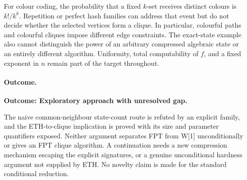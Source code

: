 \documentclass[11pt,a4paper]{article}
\numberwithin{equation}{section}
\begin{document}
For colour coding, the probability that a fixed $k$-set receives distinct
colours is $k!/k^k$. Repetition or perfect hash families can address that
event but do not decide whether the selected vertices form a clique.
In particular, colourful paths and colourful cliques impose different
edge constraints. The exact-state example also cannot distinguish the
power of an arbitrary compressed algebraic state or an entirely different
algorithm. Uniformity, total computability of $f$, and a fixed exponent in
$n$ remain part of the target throughout.

\paragraph{Outcome.}
\textbf{Outcome: Exploratory approach with unresolved gap.}

The naive common-neighbour state-count route is refuted by an explicit
family, and the ETH-to-clique implication is proved with its size and
parameter quantifiers exposed. Neither argument separates FPT from W[1]
unconditionally or gives an FPT clique algorithm. A continuation needs a
new compression mechanism escaping the explicit signatures, or a genuine
unconditional hardness argument not supplied by ETH. No novelty claim is
made for the standard conditional reduction.
\end{document}
